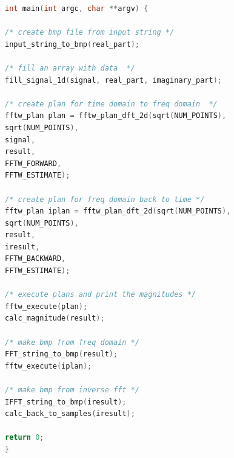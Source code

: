 \documentclass[11pt, A4, oneside]{article}
\begin{document}
\begin{lstlisting}[language=C, caption= FFTW image process main]
int main(int argc, char **argv) {

/* create bmp file from input string */
input_string_to_bmp(real_part);

/* fill an array with data  */
fill_signal_1d(signal, real_part, imaginary_part);

/* create plan for time domain to freq domain  */
fftw_plan plan = fftw_plan_dft_2d(sqrt(NUM_POINTS),
sqrt(NUM_POINTS),
signal,
result,
FFTW_FORWARD,
FFTW_ESTIMATE);

/* create plan for freq domain back to time */
fftw_plan iplan = fftw_plan_dft_2d(sqrt(NUM_POINTS),
sqrt(NUM_POINTS),
result,
iresult,
FFTW_BACKWARD,
FFTW_ESTIMATE);

/* execute plans and print the magnitudes */
fftw_execute(plan);
calc_magnitude(result);

/* make bmp from freq domain */
FFT_string_to_bmp(result);
fftw_execute(iplan);

/* make bmp from inverse fft */
IFFT_string_to_bmp(iresult);
calc_back_to_samples(iresult);

return 0;
}

\end{lstlisting}



\end{document}
